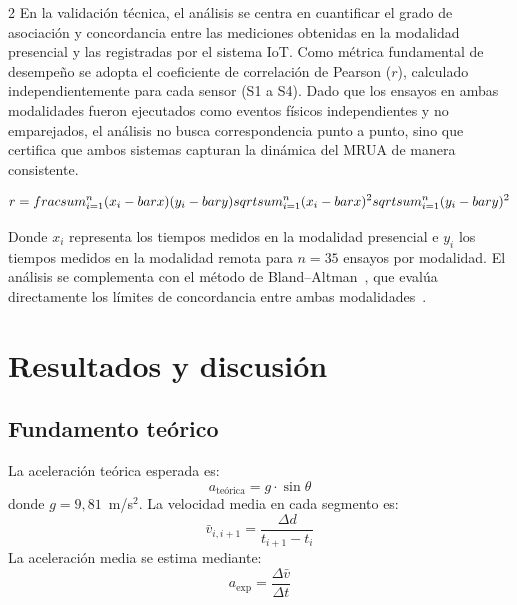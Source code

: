 \documentclass[12pt,twoside,titlepage]{ingenius}
\begin{document}
\begin{multicols}{2}
En la validaci\'on t\'ecnica, el an\'alisis se centra en cuantificar el grado de asociaci\'on y concordancia entre las mediciones obtenidas en la modalidad presencial y las registradas por el sistema IoT. Como m\'etrica fundamental de desempe\~no se adopta el coeficiente de correlaci\'on de Pearson ($r$), calculado independientemente para cada sensor (S1 a S4). Dado que los ensayos en ambas modalidades fueron ejecutados como eventos f\'isicos independientes y no emparejados, el an\'alisis no busca correspondencia punto a punto, sino que certifica que ambos sistemas capturan la din\'amica del MRUA de manera consistente.

\begin{equation}
r = \\frac{\\sum_{i=1}^{n} (x_i - \\bar{x})(y_i - \\bar{y})}{\\sqrt{\\sum_{i=1}^{n} (x_i - \\bar{x})^2} \\sqrt{\\sum_{i=1}^{n} (y_i - \\bar{y})^2}}
\label{eq:pearson}
\end{equation}

Donde $x_i$ representa los tiempos medidos en la modalidad presencial e $y_i$ los tiempos medidos en la modalidad remota para $n=35$ ensayos por modalidad. El an\'alisis se complementa con el m\'etodo de Bland--Altman~\cite{bland1986}, que eval\'ua directamente los l\'imites de concordancia entre ambas modalidades~\cite{giavarina2015}.

\section{Resultados y discusi\'on}

\subsection{Fundamento te\'orico}

La aceleraci\'on te\'orica esperada es:
\begin{equation}
  a_{\text{te\'orica}} = g \cdot \sin\theta
  \label{eq:mruateorico}
\end{equation}
donde $g = 9{,}81$~m/s$^2$. La velocidad media en cada segmento es:
\begin{equation}
  \bar{v}_{i,i+1} = \frac{\Delta d}{t_{i+1} - t_i}
  \label{eq:velocidad}
\end{equation}
La aceleraci\'on media se estima mediante:
\begin{equation}
  a_{\text{exp}} = \frac{\Delta \bar{v}}{\Delta t}
  \label{eq:aceleracion}
\end{equation}


\end{multicols}
\end{document}
